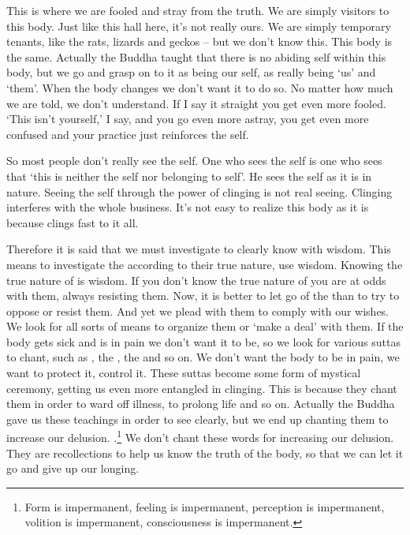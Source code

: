 This is where we are fooled and stray from the truth. We are simply visitors to this body. Just like this hall here, it's not really ours. We are simply temporary tenants, like the rats, lizards and geckos -- but we don't know this. This body is the same. Actually the Buddha taught that there is no abiding self within this body, but we go and grasp on to it as being our self, as really being `us' and `them'. When the body changes we don't want it to do so. No matter how much we are told, we don't understand. If I say it straight you get even more fooled. `This isn't yourself,' I say, and you go even more astray, you get even more confused and your practice just reinforces the self.

So most people don't really see the self. One who sees the self is one who sees that `this is neither the self nor belonging to self'. He sees the self as it is in nature. Seeing the self through the power of clinging is not real seeing. Clinging interferes with the whole business. It's not easy to realize this body as it is because  clings fast to it all.

Therefore it is said that we must investigate to clearly know with wisdom. This means to investigate the  according to their true nature, use wisdom. Knowing the true nature of  is wisdom. If you don't know the true nature of  you are at odds with them, always resisting them. Now, it is better to let go of the  than to try to oppose or resist them. And yet we plead with them to comply with our wishes. We look for all sorts of means to organize them or `make a deal' with them. If the body gets sick and is in pain we don't want it to be, so we look for various suttas to chant, such as , the , the  and so on. We don't want the body to be in pain, we want to protect it, control it. These suttas become some form of mystical ceremony, getting us even more entangled in clinging. This is because they chant them in order to ward off illness, to prolong life and so on. Actually the Buddha gave us these teachings in order to see clearly, but we end up chanting them to increase our delusion. .\footnote{Form is impermanent, feeling is impermanent, perception is impermanent, volition is impermanent, consciousness is impermanent.} We don't chant these words for increasing our delusion. They are recollections to help us know the truth of the body, so that we can let it go and give up our longing.

